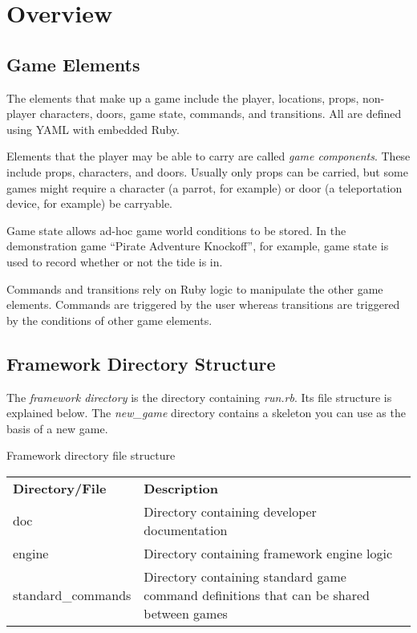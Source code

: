 \documentclass[letterpaper,10pt,english]{sphinxmanual}
\begin{document}
\chapter{Overview}
\label{overview:overview}\label{overview::doc}

\section{Game Elements}
\label{overview:game-elements}
The elements that make up a game include the player, locations, props, non-player characters, doors, game state, commands, and transitions. All are defined using YAML with embedded Ruby.

Elements that the player may be able to carry are called \emph{game components}. These include props, characters, and doors. Usually only props can be carried, but some games might require a character (a parrot, for example) or door (a teleportation device, for example) be carryable.

Game state allows ad-hoc game world conditions to be stored. In the demonstration game ``Pirate Adventure Knockoff'', for example, game state is used to record whether or not the tide is in.

Commands and transitions rely on Ruby logic to manipulate the other game elements. Commands are triggered by the user whereas transitions are triggered by the conditions of other game elements.


\section{Framework Directory Structure}
\label{overview:framework-directory-structure}
The \emph{framework directory} is the directory containing \emph{run.rb}. Its file structure is explained below. The \emph{new\_game} directory contains a skeleton you can use as the basis of a new game.

\begin{threeparttable}
\capstart\caption{Framework directory file structure}

\begin{tabulary}{\linewidth}{|L|L|}
\hline

\textbf{Directory/File}
 & 
\textbf{Description}
\\

doc
 & 
Directory containing developer documentation
\\

engine
 & 
Directory containing framework engine logic
\\

standard\_commands
 & 
Directory containing standard game command definitions that can be shared between games
\\
\hline
\end{tabulary}

\end{threeparttable}
\end{document}

